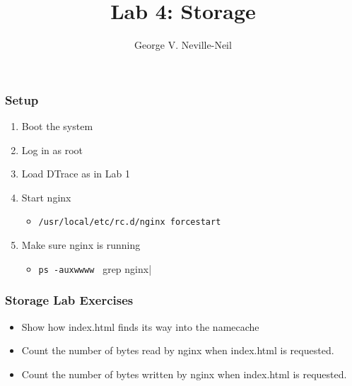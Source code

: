 \documentclass[pdftex]{beamer}
\begin{document}

\title{Lab 4: Storage}
\author[shortname]{George V. Neville-Neil}

\begin{frame}[fragile]
  \frametitle{Setup}
  \begin{enumerate}
  \item Boot the system
  \item Log in as root
  \item Load DTrace as in Lab 1
  \item Start nginx
    \begin{itemize}
    \item \verb|/usr/local/etc/rc.d/nginx forcestart|
    \end{itemize}
  \item Make sure nginx is running
    \begin{itemize}
    \item \verb|ps -auxwwww | grep nginx|
    \end{itemize}
  \end{enumerate}
\end{frame}


\begin{frame}[fragile]
  \frametitle{Storage Lab Exercises}
  \begin{itemize}
  \item Show how index.html finds its way into the namecache
  \item Count the number of bytes read by nginx when index.html is requested.
  \item Count the number of bytes written by nginx when index.html is requested.
  \end{itemize}
\end{frame}
\end{document}
